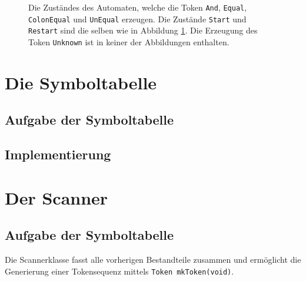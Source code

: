 \documentclass[
a4paper,   %
11pt,      %
oneside,   %
onecolumn, %
final      %
]{article}
\newcommand{\code}[1]{\lstinline$#1$}
\begin{document}
\begin{figure}
\begin{center}
\end{center}
\caption{Die Zuständes des Automaten, welche die Token \texttt{And}, \texttt{Equal}, \texttt{ColonEqual} und \texttt{UnEqual} erzeugen. Die Zustände \texttt{Start} und \texttt{Restart} sind die selben wie in Abbildung \ref{fig:autom}. Die Erzeugung des Token \texttt{Unknown} ist in keiner der Abbildungen enthalten.} \label{fig:autom}
\end{figure}



\section{Die Symboltabelle}

\subsection{Aufgabe der Symboltabelle}

\subsection{Implementierung}



\section{Der Scanner}

\subsection{Aufgabe der Symboltabelle}
Die Scannerklasse fasst alle vorherigen Bestandteile zusammen und ermöglicht die Generierung einer Tokensequenz mittels \code{Token mkToken(void)}.
\end{document}
